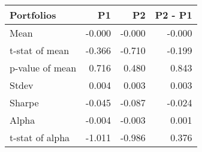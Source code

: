 \begin{tabular}{lrrr}
\toprule
Portfolios & P1 & P2 & P2 - P1 \\
\midrule
Mean & -0.000 & -0.000 & -0.000 \\
t-stat of mean & -0.366 & -0.710 & -0.199 \\
p-value of mean & 0.716 & 0.480 & 0.843 \\
Stdev & 0.004 & 0.003 & 0.003 \\
Sharpe & -0.045 & -0.087 & -0.024 \\
Alpha & -0.004 & -0.003 & 0.001 \\
t-stat of alpha & -1.011 & -0.986 & 0.376 \\
\bottomrule
\end{tabular}
